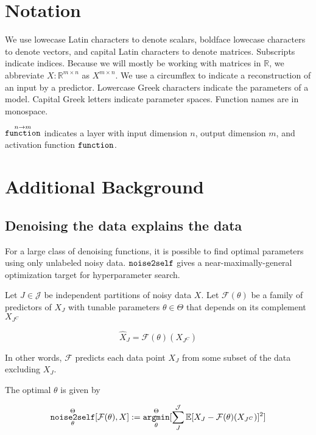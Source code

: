 \appendix

\section{Notation}
\label{app:notation}
We use lowecase Latin characters to denote scalars, boldface lowecase characters to denote vectors, and capital Latin characters to denote matrices.
Subscripts indicate indices.
Because we will mostly be working with matrices in $\mathbb{R}$, we abbreviate $X : \mathbb{R}^{m \times n}$ as $X^{m \times n}$.
We use a circumflex to indicate a reconstruction of an input by a predictor.
Lowercase Greek characters indicate the parameters of a model.
Capital Greek letters indicate parameter spaces.
Function names are in monospace.

$\mathop{\mathtt{function}}\limits^{n \to m}$ indicates a layer with input dimension $n$, output dimension $m$, and activation function $\mathop{\mathtt{function}}\limits$.

\section{Additional Background}
\label{app:bgd}

\subsection{Denoising the data explains the data}
\label{app:ntos}
For a large class of denoising functions, it is possible to find optimal parameters using only unlabeled noisy data\cite{batson2019noise2self}.
$\mathop{\mathtt{noise2self}}\limits$ gives a near-maximally-general optimization target for hyperparameter search.


Let $J \in \mathcal{J}$ be independent partitions of noisy data $X$.
Let $\mathcal{F}(\theta)$ be a family of predictors of $X_J$ with tunable parameters
$\theta \in \Theta$ that depends on its complement $X_{J^C}$

\begin{equation}
  \hat{X}_J=\mathcal{F}(\theta)(X_{J^C})
\end{equation}

In other words, $\mathcal{F}$ predicts each data point $X_J$ from some subset of the data excluding $X_J$. 

  The optimal $\theta$ is given by

\begin{equation}
  \label{eq:ntos}
  \mathop{\mathtt{noise2self}}\limits_\theta^{\Theta}[\mathcal{F}(\theta),X] := \mathop{\mathtt{argmin}}\limits_\theta^{\Theta}[\sum_{J}^{\mathcal{J}}\mathbb{E}[X_J-\mathcal{F}(\theta)(X_{J^C})]^2]
\end{equation}

